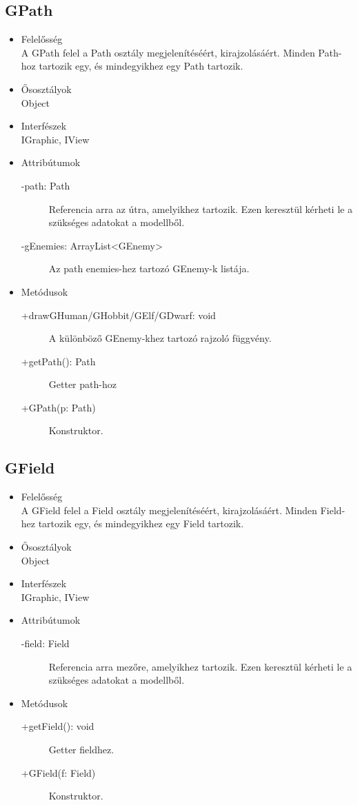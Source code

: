 \subsection{GPath}
\begin{itemize}
\item Felelősség\\
A GPath felel a Path osztály megjelenítéséért, kirajzolásáért. Minden Path-hoz tartozik egy, és mindegyikhez egy Path tartozik.
\item Ősosztályok\\
Object
\item Interfészek\\
IGraphic, IView
\item Attribútumok\\
	\begin{description}
		\item[-path: Path] Referencia arra az útra, amelyikhez tartozik. Ezen keresztül kérheti le a szükséges adatokat a modellből.
		\item[-gEnemies: ArrayList<GEnemy>] Az path enemies-hez tartozó GEnemy-k listája.
\end{description}
\item Metódusok\\
	\begin{description}
		\item[+drawGHuman/GHobbit/GElf/GDwarf: void] A különböző GEnemy-khez tartozó rajzoló függvény.
		\item[+getPath(): Path] Getter path-hoz
		\item[+GPath(p: Path)] Konstruktor.
	\end{description}
\end{itemize}

\subsection{GField}
\begin{itemize}
\item Felelősség\\
A GField felel a Field osztály megjelenítéséért, kirajzolásáért. Minden Field-hez tartozik egy, és mindegyikhez egy Field tartozik.
\item Ősosztályok\\
Object
\item Interfészek\\
IGraphic, IView
\item Attribútumok\\
	\begin{description}
		\item[-field: Field] Referencia arra  mezőre, amelyikhez tartozik. Ezen keresztül kérheti le a szükséges adatokat a modellből.
\end{description}
\item Metódusok\\
	\begin{description}
		\item[+getField(): void] Getter fieldhez.
		\item[+GField(f: Field)] Konstruktor.
	\end{description}
\end{itemize}

